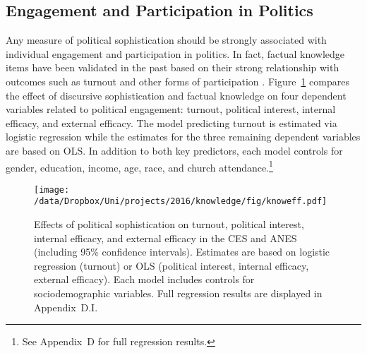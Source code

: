 \subsection*{Engagement and Participation in Politics}
Any measure of political sophistication should be strongly associated with individual engagement and participation in politics. In fact, factual knowledge items have been validated in the past based on their strong relationship with outcomes such as turnout and other forms of participation \citep[230--233]{lupia2015uninformed}. Figure~\ref{fig:knoweff} compares the effect of discursive sophistication and factual knowledge on four dependent variables related to political engagement: turnout, political interest, internal efficacy, and external efficacy. The model predicting turnout is estimated via logistic regression while the estimates for the three remaining dependent variables are based on OLS. In addition to both key predictors, each model controls for gender, education, income, age, race, and church attendance.\footnote{See Appendix~D for full regression results.}

\begin{figure}[h]\centering
\texttt{[image: /data/Dropbox/Uni/projects/2016/knowledge/fig/knoweff.pdf]}
\caption[Effects of political sophistication on turnout, political interest, internal efficacy, and external efficacy]{Effects of political sophistication on turnout, political interest, internal efficacy, and external efficacy in the CES and ANES (including 95\% confidence intervals). Estimates are based on logistic regression (turnout) or OLS (political interest, internal efficacy, external efficacy). Each model includes controls for sociodemographic variables. Full regression results are displayed in Appendix~D.I.}\label{fig:knoweff}
\end{figure}

